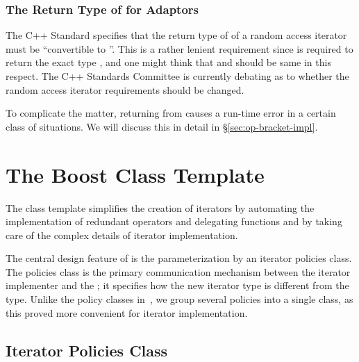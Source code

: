 \documentclass{netobjectdays}
\begin{document}
\subsubsection{The Return Type of  for Adaptors}
\label{sec:operator-bracket}

The C++ Standard specifies that the return type of 
of a random access iterator must be ``convertible to ''.  This
is a rather lenient requirement since  is required to
return the exact type , and one might think that
 and  should be same in this respect.
The C++ Standards Committee is currently debating as to whether the
random access iterator requirements should be changed.

To complicate the matter, returning  from 
causes a run-time error in a certain class of situations. We will
discuss this in detail in \S\ref{sec:op-bracket-impl}.




\section{The Boost  Class Template}

The  class template simplifies the creation
of iterators by automating the implementation of redundant operators
and delegating functions and by taking care of the complex details of
iterator implementation.

The central design feature of  is the
parameterization by an iterator policies class. The policies class is
the primary communication mechanism between the iterator implementer
and the ; it specifies how the new iterator
type is different from the  type. Unlike the policy classes
in~\cite{alexandrescu01:_modern_cpp_design}, we group several policies
into a single class, as this proved more convenient for iterator
implementation.

\subsection{Iterator Policies Class}
\end{document}
